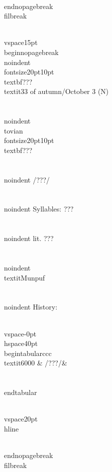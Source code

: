 \\end{nopagebreak}
\\filbreak



\\vspace{15pt}
\\begin{nopagebreak}
\\noindent{\\fontsize{20pt}{10pt}\\textbf{???} } \\textit{33 of autumn/October 3} (N)\\\\
\\noindent {\\tovian \\fontsize{20pt}{10pt} \\textbf{???} }\\\\
\\noindent /???/\\\\
\\noindent Syllables: ???\\\\
\\noindent lit. ???\\\\
\\noindent \\textit{Munpuf}\\\\


\\noindent History:

\\vspace{-0pt}
\\hspace{40pt}
\\begin{tabular}{ccc}
\\textit{6000} & /???/& \\\\
\\end{tabular}

\\vspace{20pt}\\hline

\\end{nopagebreak}
\\filbreak



